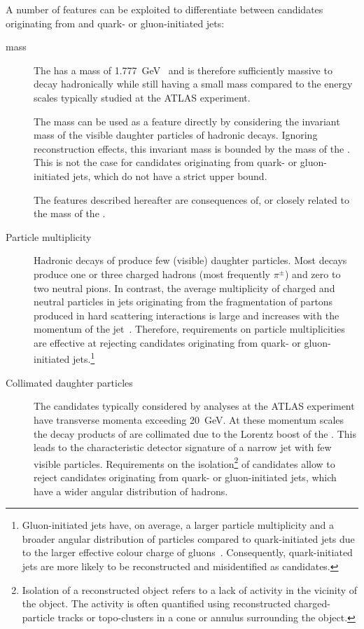 A number of features can be exploited to differentiate between
\tauhadvis candidates originating from \tauhad and quark- or
gluon-initiated jets:
\begin{description}

\item[\taulepton mass] The \taulepton has a mass of
  \SI{1.777}{\GeV}~\cite{pdg2020} and is therefore sufficiently massive to decay
  hadronically while still having a small mass compared to the energy scales
  typically studied at the ATLAS experiment.

  The \taulepton mass can be used as a feature directly by considering the
  invariant mass of the visible daughter particles of hadronic \taulepton
  decays. Ignoring reconstruction effects, this invariant mass is bounded by the
  mass of the \taulepton. This is not the case for \tauhadvis candidates
  originating from quark- or gluon-initiated jets, which do not have a strict
  upper bound.

  The features described hereafter are consequences of, or closely
  related to the mass of the \taulepton.

\item[Particle multiplicity] Hadronic decays of \tauleptons produce
  few (visible) daughter particles. Most decays produce one or three
  charged hadrons (most frequently $\pi^{\pm}$) and zero to two
  neutral pions.
  In contrast, the average multiplicity of charged and neutral particles in jets
  originating from the fragmentation of partons produced in hard scattering
  interactions is large and increases with the momentum of the
  jet~\cite{Ellis:1996mzs,STDM-2015-12}. Therefore, requirements on particle
  multiplicities are effective at rejecting \tauhadvis candidates originating
  from quark- or gluon-initiated jets.\footnote{Gluon-initiated jets have, on
    average, a larger particle multiplicity and a broader angular distribution
    of particles compared to quark-initiated jets due to the larger effective
    colour charge of gluons~\cite{Ellis:1996mzs}. Consequently, quark-initiated
    jets are more likely to be reconstructed and misidentified as \tauhadvis
    candidates.}

\item[Collimated daughter particles] The \tauhadvis candidates typically
  considered by analyses at the ATLAS experiment have transverse momenta
  exceeding \SI{20}{\GeV}. At these momentum scales the decay products of
  \tauleptons are collimated due to the Lorentz boost of the \taulepton. This
  leads to the characteristic detector signature of a narrow jet with few
  visible particles. Requirements on the isolation\footnote{Isolation of a
    reconstructed object refers to a lack of activity in the vicinity of the
    object. The activity is often quantified using reconstructed
    charged-particle tracks or topo-clusters in a cone or annulus surrounding
    the object.} of \tauhadvis candidates allow to reject candidates originating
  from quark- or gluon-initiated jets, which have a wider angular distribution
  of hadrons.


\end{description}
